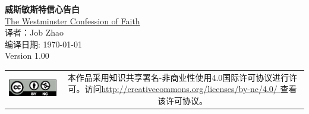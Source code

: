 \documentclass[12pt, a4paper, oneside]{ctexart}
\begin{document}
\setcounter{page}{0}
\begin{center}
	\Large{\textbf{威斯敏斯特信心告白}} \\ \vspace{2em}
	\small{\href{https://westminsterstandards.org/westminster-confession-of-faith/}{The Westminster Confession of Faith}} \\ \vspace{1em}
	\small{译者：Job Zhao} \\ \vspace{1em}
	\small{编译日期: \today} \\ \vspace{1em}
	\small{Version 1.00} \\ \vspace{1em}
\end{center}
\vfill
\vspace{28em}
\begin{tabular*}{\textwidth}{cc}
	\includegraphics{figure/by-nc.eps}
	& \begin{minipage}[b]{0.6\textwidth}
		\footnotesize
		本作品采用知识共享署名-非商业性使用4.0国际许可协议进行许可。访问\url{http://creativecommons.org/licenses/by-nc/4.0/ }查看该许可协议。
	\end{minipage}
\end{tabular*}
\vspace{2mm}
\thispagestyle{empty}

\newpage
\end{document}
